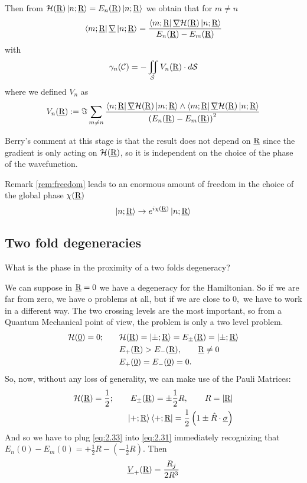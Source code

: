 Then from $ \mathcal{H}(\underline{\textrm{R}})\Ket{n;\underline{\textrm{R}}}=E_n(\underline{\textrm{R}})\Ket{n;\underline{\textrm{R}}} $ we obtain that for $ m\neq n $
\begin{equation}
\Bra{m;\underline{\textrm{R}}}\underline{\nabla}\Ket{n;\underline{\textrm{R}}}=\dfrac{\Bra{m;\underline{\textrm{R}}}\underline{\nabla}\mathcal{H}(\underline{\textrm{R}})\Ket{n;\underline{\textrm{R}}}}{E_n(\underline{\textrm{R}})-E_m(\underline{\textrm{R}})}
\end{equation}
with \begin{equation}
\gamma_n(\mathcal{C})=-\iint_{\mathcal{S}}V_n(\underline{\textrm{R}})\cdot\mathop{}\!d\mathcal{S}
\end{equation}
where we defined $ V_n $ as 
\begin{equation}
V_n(\underline{\textrm{R}}):=\Im\sum_{m\neq n}\dfrac{\Bra{n;\underline{\textrm{R}}}\underline{\nabla}\mathcal{H}(\underline{\textrm{R}})\Ket{m;\underline{\textrm{R}}}\wedge\Bra{m;\underline{\textrm{R}}}\underline{\nabla}\mathcal{H}(\underline{\textrm{R}})\Ket{n;\underline{\textrm{R}}}}{\left(E_n(\underline{\textrm{R}})-E_m(\underline{\textrm{R}})\right)^2}
\label{eq:2.31}
\end{equation}
\begin{rem}
	Berry's comment at this stage is that the result does not depend on $ \underline{\textrm{R}} $ since the gradient is only acting on $ \mathcal{H}(\underline{\textrm{R}}) $, so it is independent on the choice of the phase of the wavefunction.
	\label{rem:freedom}
\end{rem}
Remark \ref{rem:freedom} leads to an enormous amount of freedom in the choice of the global phase $ \chi(\underline{\textrm{R}}) $
\begin{equation}
\Ket{n;\underline{\textrm{R}}}\to e^{i\chi(\underline{\textrm{R}})}\Ket{n;\underline{\textrm{R}}}
\end{equation}
\subsection{Two fold degeneracies}
What is the phase in the proximity of a two folds degeneracy?

We can suppose in $ \underline{\textrm{R}}=0 $ we have a degeneracy for the Hamiltonian. So if we are far from zero, we have o problems at all, but if we are close to $ 0, $ we have to work in a different way. The two crossing levels are the most important, so from a Quantum Mechanical point of view, the problem is only a two level problem.
\begin{align}
	\mathcal{H}(\underline{0})=0; \qquad & \mathcal{H}(\underline{\textrm{R}})=\Ket{\pm;\underline{\textrm{R}}}=E_{\pm}(\underline{\textrm{R}})=\Ket{\pm;\underline{\textrm{R}}}\\
	& E_{+}(\underline{\textrm{R}})>E_-(\underline{\textrm{R}}),\qquad \underline{\textrm{R}}\neq 0\\
	& E_{+}(\underline{0})=E_{-}(\underline{0})=0.
\end{align} 
So, now, without any loss of generality, we can make use of the Pauli Matrices:
\begin{align}
	\mathcal{H}(\underline{\textrm{R}})=\dfrac{1}{2};\qquad E_{\pm}(\underline{\textrm{R}})=\pm\dfrac{1}{2}R, \qquad R=\lvert\underline{\textrm{R}}\rvert\\
	\Ket{+;\underline{\textrm{R}}}\Bra{+;\underline{\textrm{R}}}=\dfrac{1}{2}\left(1\pm \hat{R}\cdot\underline{\sigma} \right)\label{eq:2.33}
\end{align}
And so we have to plug \eqref{eq:2.33} into \eqref{eq:2.31} immediately recognizing that $ E_n(0)-E_m(0)=+\frac{1}{2}R-(-\frac{1}{2}R) $. Then 
\begin{equation}
\underline{V}_{+}(\underline{\textrm{R}})=\frac{R_j}{2R^3}
\label{eq:2.35}
\end{equation}

